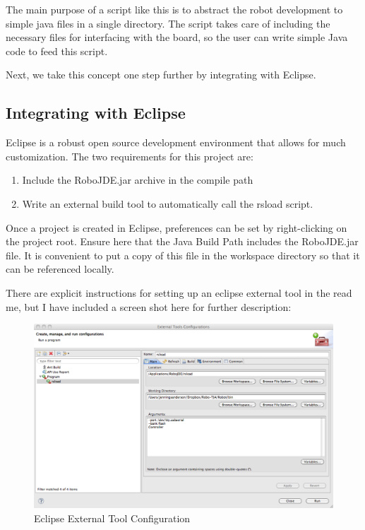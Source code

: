 \documentclass[12pt]{article}
\begin{document}
The main purpose of a script like this is to abstract the robot development to simple java files in a single directory.  The script takes care of including the necessary files for interfacing with the board, so the user can write simple Java code to feed this script.

Next, we take this concept one step further by integrating with Eclipse.

\subsection{Integrating with Eclipse}
Eclipse is a robust open source development environment that allows for much customization.  The two requirements for this project are:
\begin{enumerate}
\item Include the RoboJDE.jar archive in the compile path
\item Write an external build tool to automatically call the rsload script.
\end{enumerate}

Once a project is created in Eclipse, preferences can be set by right-clicking on the project root.  Ensure here that the Java Build Path includes the RoboJDE.jar file.  It is convenient to put a copy of this file in the workspace directory so that it can be referenced locally.

There are explicit instructions for setting up an eclipse external tool in the read me, but I have included a screen shot here for further description:
\clearpage
\begin{figure}[h]
\includegraphics[scale=.4]{img/externalTool}
\caption{Eclipse External Tool Configuration}
\end{figure}
\end{document}

